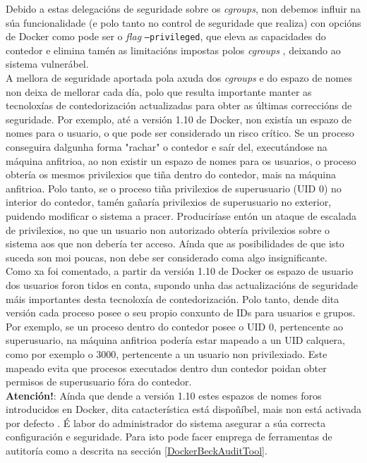Debido a estas delegacións de seguridade sobre os \textit{cgroups}, non debemos influir na súa funcionalidade (e polo tanto no control de seguridade que realiza) con opcións de Docker como pode ser o \textit{flag} {\tt --privileged}, que eleva as capacidades do contedor e elimina tamén as limitacións impostas polos \textit{cgroups} \cite{state-of-art-docker-security}, deixando ao sistema vulnerábel.\\

A mellora de seguridade aportada pola axuda dos \textit{cgroups} e do espazo de nomes non deixa de mellorar cada día, polo que resulta importante manter as tecnoloxías de contedorización actualizadas para obter as últimas correccións de seguridade. Por exemplo, até a versión 1.10 de Docker, non existía un espazo de nomes para o usuario, o que pode ser considerado un risco crítico. Se un proceso conseguira dalgunha forma "rachar" o contedor e saír del, executándose na máquina anfitrioa, ao non existir un espazo de nomes para os usuarios, o proceso obtería os mesmos privilexios que tiña dentro do contedor, mais na máquina anfitrioa. Polo tanto, se o proceso tiña privilexios de superusuario (UID 0) no interior do contedor, tamén gañaría privilexios de superusuario no exterior, puidendo modificar o sistema a pracer. Produciríase entón un ataque de escalada de privilexios, no que un usuario non autorizado obtería privilexios sobre o sistema aos que non debería ter acceso. Aínda que as posibilidades de que isto suceda son moi poucas, non debe ser considerado coma algo insignificante.\\

Como xa foi comentado, a partir da versión 1.10 de Docker os espazo de usuario dos usuarios foron tidos en conta, supondo unha das actualizacións de seguridade máis importantes desta tecnoloxía de contedorización. Polo tanto, dende dita versión cada proceso posee o seu propio conxunto de IDs para usuarios e grupos. Por exemplo, se un proceso dentro do contedor posee o UID 0, pertencente ao superusuario, na máquina anfitrioa podería estar mapeado a un UID calquera, como por exemplo o 3000, pertencente a un usuario non privilexiado. Este mapeado evita que procesos executados dentro dun contedor poidan obter permisos de superusuario fóra do contedor. \cite{state-of-art-docker-security} \\

\textbf{Atención!}: Aínda que dende a versión 1.10 estes espazos de nomes foros introducidos en Docker, dita catacterística está dispoñíbel, mais non está activada por defecto \cite{docker-security}. É labor do administrador do sistema asegurar a súa correcta configuración e seguridade. Para isto pode facer emprega de ferramentas de autitoría como a descrita na sección \ref{DockerBeckAuditTool}.

